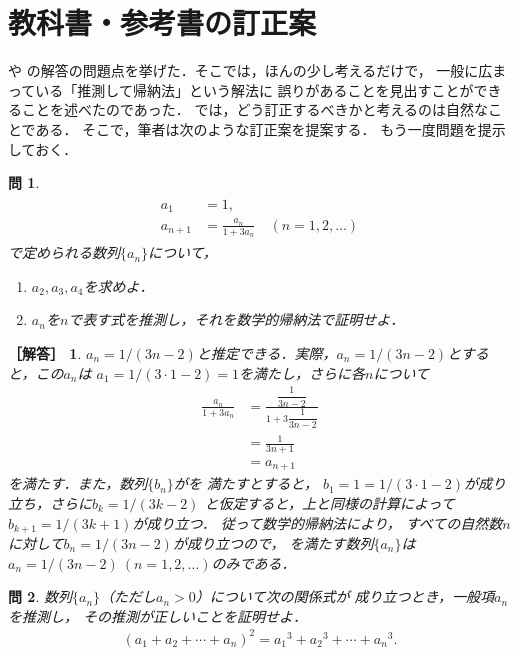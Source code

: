 \documentclass[11pt,a4paper]{ltjsarticle} %
\theoremstyle{mystyle} %
\newtheorem{que}{問} %
\newtheorem*{ans}{［解答］} %
\begin{document}
\section{教科書・参考書の訂正案}

や
の解答の問題点を挙げた．そこでは，ほんの少し考えるだけで，
一般に広まっている「推測して帰納法」という解法に
誤りがあることを見出すことができることを述べたのであった．
では，どう訂正するべきかと考えるのは自然なことである．
そこで，筆者は次のような訂正案を提案する．
もう一度問題を提示しておく．

\begin{que} \label{que:suisokuchertkai}
  \begin{align}
    \begin{aligned}
      a_1 & = 1, \\
      a_{n+1} & = \frac{a_n}{1 + 3 a_n} \quad ( n = 1,2,\ldots )
    \end{aligned}
    \label{eq:zenkasikikai}
  \end{align}
  で定められる数列$\{ a_n \}$について，
  \begin{enumerate}
    \item $a_2,a_3,a_4$を求めよ．
    \item $a_n$を$n$で表す式を推測し，それを数学的帰納法で証明せよ．
  \end{enumerate}
\end{que}



\begin{ans} 
  $a_n = 1/(3n-2)$と推定できる．実際，$a_n = 1/(3n-2)$とすると，この$a_n$は
  $a_1= 1/(3 \cdot 1 -2) =1$を満たし，さらに各$n$について
  \begin{align*}
    \frac{a_n}{1+ 3 a_n} & = 
    \frac{ \dfrac{1}{3n-2} }{ 1+ 3 \dfrac{1}{3n-2} } \\
    & = \frac{1}{3n+1} \\
    & = a_{n+1}
  \end{align*}
  を満たす．また，数列$\{ b_n \}$がを
  満たすとすると，
  $b_1 = 1 = 1/(3 \cdot 1 -2)$が成り立ち，さらに$b_k=1/(3k-2)$
  と仮定すると，上と同様の計算によって$b_{k+1} = 1/(3k+1)$が成り立つ．
  従って数学的帰納法により，
  すべての自然数$n$に対して$b_n = 1/(3n-2)$が成り立つので，
  を満たす数列$\{ a_n \}$は
  $a_n = 1/(3n-2) \ (n =1,2, \ldots)$のみである．
\end{ans}

\begin{que} \label{que:suisokuchert2kai}
  数列$\{ a_n \}$（ただし$a_n > 0$）について次の関係式が
  成り立つとき，一般項$a_n$を推測し，
  その推測が正しいことを証明せよ．
  \begin{align}
    ( a_1 + a_2 + \cdots + a_n )^2 =
    {a_1} ^3 + {a_2} ^3 + \cdots + {a_n } ^3 .
    \label{eq:suisoku2kai}
  \end{align}
\end{que}
\end{document}
